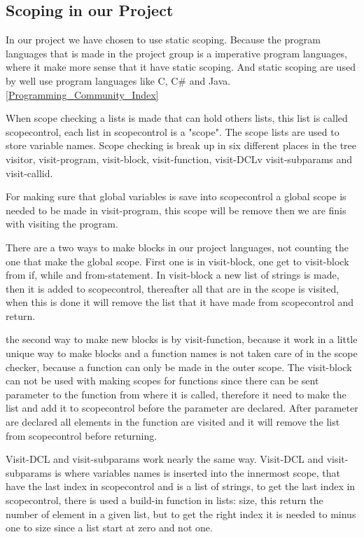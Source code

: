 \subsection{Scoping in our Project}
In our project we have chosen to use static scoping. Because the program languages that is made in the project group is a imperative program languages, where it make more sense that it have static scoping. And static scoping are used by well use program languages like C, C# and Java. \ref{Programming_Community_Index}

When scope checking a lists is made that can hold others lists, this list is called scopecontrol, each list in scopecontrol is a "scope". The scope lists are used to store variable names. Scope checking is break up in six different places in the tree visitor, visit-program, visit-block, visit-function, visit-DCLv visit-subparams and visit-callid.

For making sure that global variables is save into scopecontrol a global scope is needed to be made in visit-program, this scope will be remove then we are finis with visiting the program.

There are a two ways to make blocks in our project languages, not counting the one that make the global scope. First one is in visit-block, one get to visit-block from if, while and from-statement. In visit-block a new list of strings is made, then it is added to scopecontrol, thereafter all that are in the scope is visited, when this is done it will remove the list that it have made from scopecontrol and return.

the second way to make new blocks is by visit-function, because it work in a little unique way to make blocks and a function names is not taken care of in the scope checker, because a function can only be made in the outer scope. The visit-block can not be used with making scopes for functions since there can be sent parameter to the function from where it is called, therefore it need to make the list and add it to scopecontrol before the parameter are declared. After parameter are declared all elements in the function are visited and it will remove the list from scopecontrol before returning.

Visit-DCL and visit-subparams work nearly the same way. Visit-DCL and visit-subparams is where variables names is inserted into the innermost scope, that have the last index in scopecontrol and is a list of strings, to get the last index in scopecontrol, there is used a build-in function in lists: size, this return the number of element in a given list, but to get the right index it is needed to minus one to size since a list start at zero and not one.


